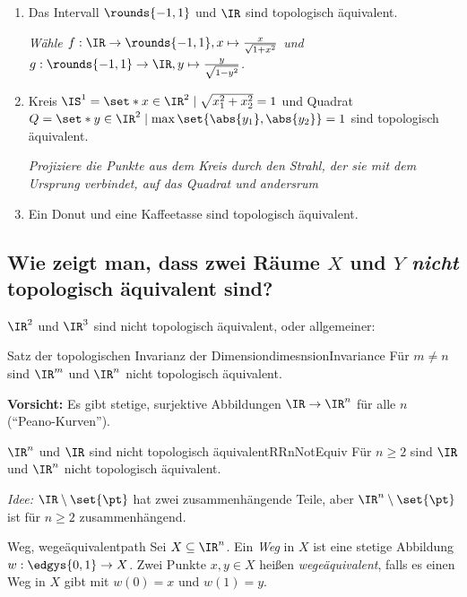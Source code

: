 \documentclass[language=ngerman]{TemplateLecture} %
\begin{document}
\begin{example}\leavevmode
    \begin{enumerate}[$(i)$]
        \item Das Intervall $\rounds{-1,1}$ und $\IR$ sind topologisch äquivalent.
        
        \emph{Wähle $f: \IR \to \rounds{-1,1}, x \mapsto \frac{x}{\sqrt{1 + x^2}}$ und $g: \rounds{-1,1} \to \IR, y \mapsto \frac{y}{\sqrt{1 - y^2}}$.}
        \item Kreis $\IS^1 = \set*{x \in \IR^2 \mid \sqrt{x_1^2 + x_2^2} = 1}$ und Quadrat $Q = \set*{y \in \IR^2 \mid \max\set{\abs{y_1}, \abs{y_2}} = 1}$ sind topologisch äquivalent.
        
        \emph{Projiziere die Punkte aus dem Kreis durch den Strahl, der sie mit dem Ursprung verbindet, auf das Quadrat und andersrum}
        \item Ein Donut und eine Kaffeetasse sind topologisch äquivalent.
    \end{enumerate}
\end{example}

\subsection*{Wie zeigt man, dass zwei Räume $X$ und $Y$ \emph{nicht} topologisch äquivalent sind?}
\begin{example}
    $\IR^2$ und $\IR^3$ sind nicht topologisch äquivalent, oder allgemeiner:
\end{example}

\begin{thm}{Satz der topologischen Invarianz der Dimension}{dimesnsionInvariance}
    Für $m \neq n$ sind $\IR^m$ und $\IR^n$ nicht topologisch äquivalent.
\end{thm}

\textbf{Vorsicht:} Es gibt stetige, surjektive Abbildungen $\IR \to \IR^n$ für alle $n$ (\enquote{Peano-Kurven}).

\begin{thm}{$\IR^n$ und $\IR$ sind nicht topologisch äquivalent}{RRnNotEquiv}
    Für $n \geq 2$ sind $\IR$ und $\IR^n$ nicht topologisch äquivalent.
\end{thm}

\emph{Idee:} $\IR \setminus \set{\pt}$ hat zwei zusammenhängende Teile, aber $\IR^n \setminus \set{\pt}$ ist für $n \geq 2$ zusammenhängend.

\begin{defi}{Weg, wegeäquivalent}{path}
    Sei $X \subseteq \IR^n$. Ein \emph{Weg} in $X$ ist eine stetige Abbildung $w: \edgys{0,1} \to X$. Zwei Punkte $x, y \in X$ heißen \emph{wegeäquivalent}, falls es einen Weg in $X$ gibt mit $w(0) = x$ und $w(1) = y$.
\end{defi}
\end{document}
